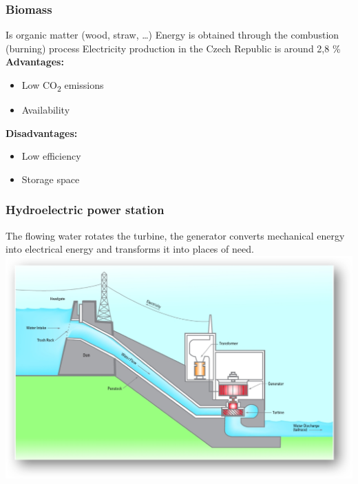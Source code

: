 \documentclass[usepdftitle=true]{beamer}
\begin{document}
\begin{frame}
	\frametitle{Biomass}
	Is organic matter (wood, straw, …) 
	Energy is obtained through the combustion (burning) process\newline
	Electricity production in the Czech Republic is around 2,8 \%
	\vspace{0.25cm}
	\newline
	\textbf{Advantages:}
	\begin{itemize}
		\item Low CO\textsubscript{2} emissions
		\item Availability
	\end{itemize}
	\textbf{Disadvantages:}
	\begin{itemize}
		\item Low efficiency
		\item Storage space
	\end{itemize}
\end{frame}

\begin{frame}
	\frametitle{Hydroelectric power station}
	The flowing water rotates the turbine, the generator converts mechanical energy into electrical energy and transforms it into places of need.
	\center
	\includegraphics[scale=0.45]{img/water_plant.png}
\end{frame}
\end{document}
